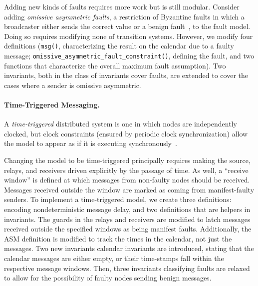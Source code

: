 \documentclass{llncs/llncs}
\begin{document}
{Adding new kinds of faults requires more work but is still modular. Consider adding \emph{omissive asymmetric faults}, a restriction of Byzantine faults in which a broadcaster either sends the correct value or a benign fault~\cite{omissive}, to the fault model. Doing so requires modifying none of transition systems. However, we modify four definitions (\texttt{msg()}, characterizing the result on the calendar due to a faulty message; \texttt{omissive\_asymmetric\_fault\_constraint()}, defining the fault, and two functions that characterize the overall maximum fault assumption). Two invariants, both in the class of invariants cover faults, are extended to cover the cases where a sender is omissive asymmetric.

\paragraph{Time-Triggered Messaging.}
A \emph{time-triggered} distributed system is one in which nodes are independently clocked, but clock constraints (ensured by periodic clock synchronization) allow the model to appear as if it is executing synchronously~\cite{kopetz}.

Changing the model to be time-triggered principally requires making the source, relays, and receivers driven explicitly by the passage of time. As well, a ``receive window'' is defined at which messages from non-faulty nodes should be received. Messages received outside the window are marked as coming from manifest-faulty senders. To implement a time-triggered model, we create three definitions: encoding nondeterministic message delay, and two definitions that are helpers in invariants. The guards in the relays and receivers are modified to latch messages received outside the specified windows as being manifest faults. Additionally, the ASM definition is modified to track the times in the calendar, not just the messages. Two new invariants calendar invariants are introduced, stating that the calendar messages are either empty, or their time-stamps fall within the respective message windows. Then, three invariants classifying faults are relaxed to allow for the possibility of faulty nodes sending benign messages.

}
\end{document}
